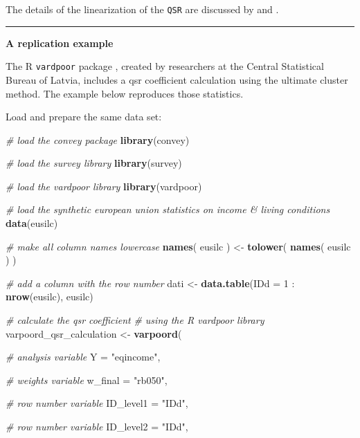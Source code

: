 \documentclass[]{book}
\newenvironment{Shaded}{\begin{snugshade}}{\end{snugshade}}
\newcommand{\KeywordTok}[1]{\textcolor[rgb]{0.13,0.29,0.53}{\textbf{{#1}}}}
\newcommand{\DataTypeTok}[1]{\textcolor[rgb]{0.13,0.29,0.53}{{#1}}}
\newcommand{\DecValTok}[1]{\textcolor[rgb]{0.00,0.00,0.81}{{#1}}}
\newcommand{\StringTok}[1]{\textcolor[rgb]{0.31,0.60,0.02}{{#1}}}
\newcommand{\CommentTok}[1]{\textcolor[rgb]{0.56,0.35,0.01}{\textit{{#1}}}}
\newcommand{\NormalTok}[1]{{#1}}
\begin{document}
The details of the linearization of the \texttt{QSR} are discussed by
\citet{deville1999} and \citet{osier2009}.

\begin{center}\rule{0.5\linewidth}{\linethickness}\end{center}

\textbf{A replication example}

The R \texttt{vardpoor} package \citep{vardpoor}, created by researchers
at the Central Statistical Bureau of Latvia, includes a qsr coefficient
calculation using the ultimate cluster method. The example below
reproduces those statistics.

Load and prepare the same data set:

\begin{Shaded}
\begin{Highlighting}[]
\CommentTok{# load the convey package}
\KeywordTok{library}\NormalTok{(convey)}

\CommentTok{# load the survey library}
\KeywordTok{library}\NormalTok{(survey)}

\CommentTok{# load the vardpoor library}
\KeywordTok{library}\NormalTok{(vardpoor)}

\CommentTok{# load the synthetic european union statistics on income & living conditions}
\KeywordTok{data}\NormalTok{(eusilc)}

\CommentTok{# make all column names lowercase}
\KeywordTok{names}\NormalTok{( eusilc ) <-}\StringTok{ }\KeywordTok{tolower}\NormalTok{( }\KeywordTok{names}\NormalTok{( eusilc ) )}

\CommentTok{# add a column with the row number}
\NormalTok{dati <-}\StringTok{ }\KeywordTok{data.table}\NormalTok{(}\DataTypeTok{IDd =} \DecValTok{1} \NormalTok{:}\StringTok{ }\KeywordTok{nrow}\NormalTok{(eusilc), eusilc)}

\CommentTok{# calculate the qsr coefficient}
\CommentTok{# using the R vardpoor library}
\NormalTok{varpoord_qsr_calculation <-}
\StringTok{    }\KeywordTok{varpoord}\NormalTok{(}
    
        \CommentTok{# analysis variable}
        \DataTypeTok{Y =} \StringTok{"eqincome"}\NormalTok{, }
        
        \CommentTok{# weights variable}
        \DataTypeTok{w_final =} \StringTok{"rb050"}\NormalTok{,}
        
        \CommentTok{# row number variable}
        \DataTypeTok{ID_level1 =} \StringTok{"IDd"}\NormalTok{,}
        
        \CommentTok{# row number variable}
        \DataTypeTok{ID_level2 =} \StringTok{"IDd"}\NormalTok{,}
        

\end{Highlighting}
\end{Shaded}
\end{document}
